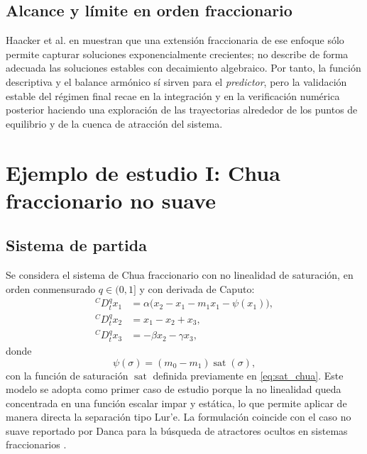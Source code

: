 \documentclass[journal]{IEEEtran}
\begin{document}
\subsection{Alcance y límite en orden fraccionario}

Haacker et al. en \cite{Haacker2026} muestran que una extensión fraccionaria de ese enfoque sólo permite capturar soluciones exponencialmente crecientes; no describe de forma adecuada las soluciones estables con decaimiento algebraico. Por tanto, la función descriptiva y el balance armónico sí sirven para el \emph{predictor}, pero la validación estable del régimen final recae en la integración y en la verificación numérica posterior haciendo una exploración de las trayectorias alrededor de los puntos de equilibrio y de la cuenca de atracción del sistema.

\section{Ejemplo de estudio I: Chua fraccionario no suave}
\label{sec:chua_nonsmooth_frac}

\subsection{Sistema de partida}

Se considera el sistema de Chua fraccionario con no linealidad de saturación, en orden conmensurado $q\in(0,1]$ y con derivada de Caputo:
\begin{equation}
\label{eq:chua_ns_system}
\begin{aligned}
{}^{C}D_t^q x_1 &= \alpha\bigl(x_2-x_1-m_1x_1-\psi(x_1)\bigr),\\
{}^{C}D_t^q x_2 &= x_1-x_2+x_3,\\
{}^{C}D_t^q x_3 &= -\beta x_2-\gamma x_3,
\end{aligned}
\end{equation}
donde
\begin{equation}
\label{eq:psi_ns_def}
\psi(\sigma)=(m_0-m_1)\operatorname{sat}(\sigma),
\end{equation}
con la función de saturación \(\operatorname{sat}\) definida previamente en \eqref{eq:sat_chua}.
Este modelo se adopta como primer caso de estudio porque la no linealidad queda concentrada en una función escalar impar y estática, lo que permite aplicar de manera directa la separación tipo Lur'e. La formulación coincide con el caso no suave reportado por Danca para la búsqueda de atractores ocultos en sistemas fraccionarios \cite{Danca2017}. 
\end{document}
